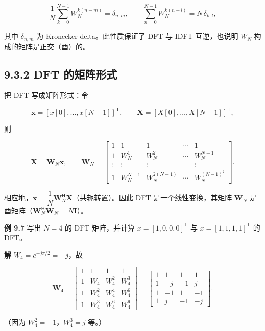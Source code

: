 \[
\frac{1}{N}\sum_{k=0}^{N-1} W_N^{k(n-m)} = \delta_{n,m},
\qquad
\sum_{n=0}^{N-1} W_N^{k(n-l)} = N\,\delta_{k,l},
\]

其中 \(\delta_{n,m}\) 为 Kronecker delta。此性质保证了 DFT 与 IDFT
互逆，也说明 \(W_N\) 构成的矩阵是正交（酉）的。

\subsection{9.3.2 DFT
的矩阵形式}\label{dft-ux7684ux77e9ux9635ux5f62ux5f0f}

把 DFT 写成矩阵形式：令

\[
\mathbf{x}=[x[0],\ldots,x[N-1]]^{\mathsf{T}},\qquad
\mathbf{X}=[X[0],\ldots,X[N-1]]^{\mathsf{T}},
\]

则

\[
\mathbf{X} = \mathbf{W}_N \mathbf{x},
\qquad
\mathbf{W}_N =
\begin{bmatrix}
1 & 1 & 1 & \cdots & 1 \\
1 & W_N^1 & W_N^2 & \cdots & W_N^{N-1} \\
\vdots & \vdots & \vdots & & \vdots \\
1 & W_N^{N-1} & W_N^{2(N-1)} & \cdots & W_N^{(N-1)^2}
\end{bmatrix}.
\]

相应地，\(\mathbf{x} = \dfrac{1}{N}\mathbf{W}_N^{\mathsf{H}}\mathbf{X}\)（共轭转置）。因此
DFT 是一个线性变换，其矩阵 \(\mathbf{W}_N\)
是酉矩阵（\(\mathbf{W}_N^{\mathsf{H}}\mathbf{W}_N = N\mathbf{I}\)）。

\textbf{例 9.7} 写出 \(N=4\) 的 DFT 矩阵，并计算
\(x=[1,0,0,0]^{\mathsf{T}}\) 与 \(x=[1,1,1,1]^{\mathsf{T}}\) 的 DFT。

\textbf{解} \(W_4=e^{-j\pi/2}=-j\)，故

\[
\mathbf{W}_4=
\begin{bmatrix}
1 & 1 & 1 & 1\\
1 & W_4 & W_4^2 & W_4^3\\
1 & W_4^2 & W_4^4 & W_4^6\\
1 & W_4^3 & W_4^6 & W_4^9
\end{bmatrix}
=
\begin{bmatrix}
1 & 1 & 1 & 1\\
1 & -j & -1 & j\\
1 & -1 & 1 & -1\\
1 & j & -1 & -j
\end{bmatrix}.
\]

（因为 \(W_4^2=-1\)，\(W_4^3=j\) 等。）

